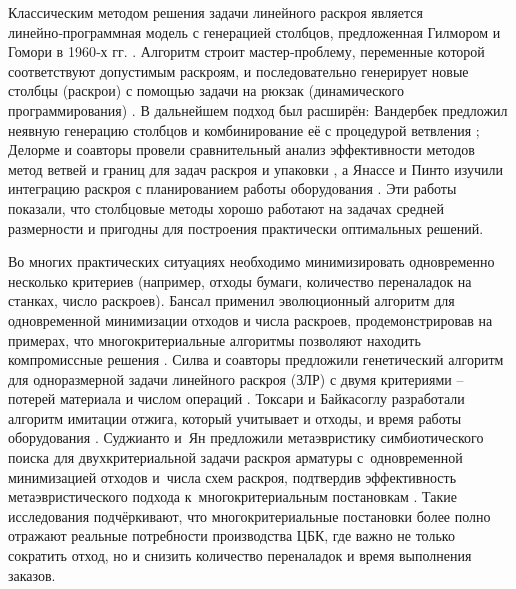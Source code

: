 Классическим методом решения задачи линейного раскроя является линейно‑программная модель с генерацией столбцов, предложенная Гилмором и Гомори в 1960‑х гг.
\cite{gilmore1961linear,gilmore1963linear}.
Алгоритм строит мастер‑проблему, переменные которой соответствуют допустимым раскроям, и последовательно генерирует новые столбцы (раскрои) с помощью задачи на рюкзак (динамического программирования) \cite{струченков2017динамическое,лааксонен2019олимпиадное}.
В дальнейшем подход был расширён: Вандербек предложил неявную генерацию столбцов и комбинирование её с процедурой ветвления \cite{vanderbeck2000integer}; Делорме и соавторы провели сравнительный анализ эффективности методов метод ветвей и границ для задач раскроя и упаковки \cite{delorme2016bin}, а Янассе и Пинто изучили интеграцию раскроя с планированием работы оборудования \cite{yanasse2007integrated}.
Эти работы показали, что столбцовые методы хорошо работают на задачах средней размерности и пригодны для построения практически оптимальных решений.

Во многих практических ситуациях необходимо минимизировать одновременно несколько критериев (например, отходы бумаги, количество переналадок на станках, число раскроев).
Бансал применил эволюционный алгоритм для одновременной минимизации отходов и числа раскроев, продемонстрировав на примерах, что многокритериальные алгоритмы позволяют находить компромиссные решения \cite{araujo2014genetic}.
Силва и соавторы предложили генетический алгоритм для одноразмерной задачи линейного раскроя (ЗЛР) с двумя критериями – потерей материала и числом операций \cite{golfeto2009genetic}.
Токсари и Байкасоглу разработали алгоритм имитации отжига, который учитывает и отходы, и время работы оборудования \cite{lai1997developing}.
Суджианто и~Ян предложили метаэвристику симбиотического поиска для двухкритериальной задачи раскроя арматуры с~одновременной минимизацией отходов и~числа схем раскроя, подтвердив эффективность метаэвристического подхода к~многокритериальным постановкам \cite{sugianto2022rebar}.
Такие исследования подчёркивают, что многокритериальные постановки более полно отражают реальные потребности производства ЦБК, где важно не только сократить отход, но и снизить количество переналадок и время выполнения заказов.

